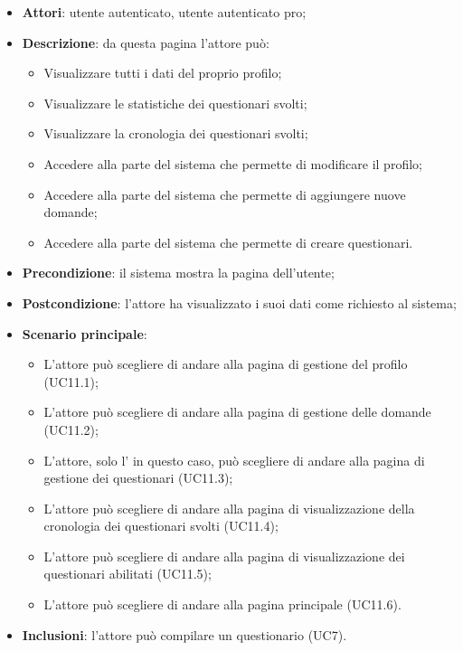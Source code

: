 \begin{itemize}
\item\textbf{Attori}: utente autenticato, utente autenticato pro;
\item\textbf{Descrizione}: da questa pagina l'attore può: 
\begin{itemize}
	\item Visualizzare tutti i dati del proprio profilo;
	\item Visualizzare le statistiche dei questionari svolti;
	\item Visualizzare la cronologia dei questionari svolti;
	\item Accedere alla parte del sistema che permette di modificare il profilo;
	\item Accedere alla parte del sistema che permette di aggiungere nuove domande;
	\item Accedere alla parte del sistema che permette di creare questionari.
\end{itemize}
\item\textbf{Precondizione}: il sistema mostra la pagina dell'utente;
\item\textbf{Postcondizione}: l'attore ha visualizzato i suoi dati come richiesto al sistema;
\item\textbf{Scenario principale}:
\begin{itemize}
\item L'attore può scegliere di andare alla pagina di gestione del profilo (UC11.1);
\item L'attore può scegliere di andare alla pagina di gestione delle domande (UC11.2);  
\item L'attore, solo l'\uaupro{} in questo caso, può scegliere di andare alla pagina di gestione dei questionari (UC11.3);
\item L'attore può scegliere di andare alla pagina di visualizzazione della cronologia dei questionari svolti (UC11.4);
\item L'attore può scegliere di andare alla pagina di visualizzazione dei questionari abilitati (UC11.5);
\item L'attore può scegliere di andare alla pagina principale (UC11.6).		
\end{itemize}
\item\textbf{Inclusioni}: l'attore può compilare un questionario (UC7).
\end{itemize}

